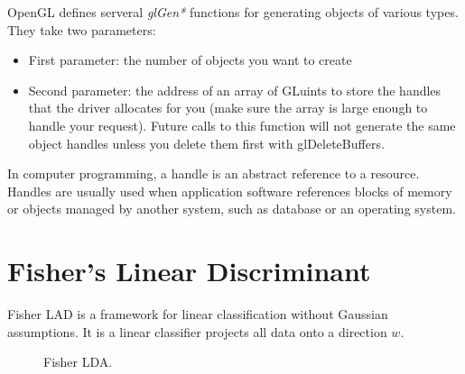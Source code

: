 OpenGL defines serveral \textit{glGen*} functions for generating objects of various
types. They take two parameters:
\begin{itemize}
	\item First parameter: the number of objects you want to create
	\item Second parameter: the address of an array of GLuints to store the handles that the driver
	allocates for you (make sure the array is large enough to handle your request). Future calls to this function will not generate the same object handles unless you delete them first with glDeleteBuffers.
\end{itemize} 

In computer programming, a handle is an abstract reference to a resource. Handles are usually 
used when application software references blocks of memory or objects managed by another
system, such as database or an operating system.
 




\section{Fisher's Linear Discriminant}
 Fisher LAD is a framework for linear classification without Gaussian assumptions. It is a linear classifier projects all data onto a direction $w$.

\begin{figure}[h]
	\caption{Fisher LDA.}
\end{figure}

